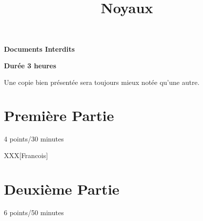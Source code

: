 %
%
%
%
%
%

%
%

%
%

\def\path{../../..}

%
%



%
%

\title{Noyaux}

%
%



%
%

\maketitle

%
%

\indentation{}

%
%

\begin{center}

\textbf{Documents Interdits}

\textbf{Dur\'ee 3 heures}

\scriptsize{Une copie bien pr\'esent\'ee sera toujours mieux not\'ee
            qu'une autre.}

\end{center}

%
%

%
%

\section{Premi\`ere Partie}
{\hfill{} \scriptsize{4 points/30 minutes}}

XXX[Francois]

%
%

\section{Deuxi\`eme Partie}
{\hfill{} \scriptsize{6 points/50 minutes}}

